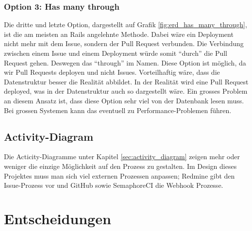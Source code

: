\subsubsection{Option 3: Has many through}
Die dritte und letzte Option, dargestellt auf Grafik \ref{fig:erd_has_many_through}, ist die am meisten an Rails angelehnte
Methode. Dabei wäre ein Deployment nicht mehr mit dem Issue, sondern der Pull Request verbunden. Die Verbindung zwischen
einem Issue und einem Deployment würde somit \enquote{durch} die Pull Request gehen. Deswegen das \enquote{through} im Namen.
Diese Option ist möglich, da wir Pull Requests deployen und nicht Issues. \newline
Vorteilhaftig wäre, dass die Datenstruktur besser die Realität abbildet. In der Realität wird eine Pull Request deployed,
was in der Datenstruktur auch so dargestellt wäre. \newline
Ein grosses Problem an diesem Ansatz ist, dass diese Option sehr viel von der Datenbank lesen muss. Bei grossen Systemen
kann das eventuell zu Performance-Problemen führen.

\subsection{Activity-Diagram}
Die Acticity-Diagramme unter Kapitel \ref{sec:activity_diagram} zeigen mehr oder weniger die einzige Möglichkeit auf den
Prozess zu gestalten. Im Design dieses Projektes muss man sich viel externen Prozessen anpassen; Redmine gibt den
Issue-Prozess vor und GitHub sowie SemaphoreCI die Webhook Prozesse.

\section{Entscheidungen}
